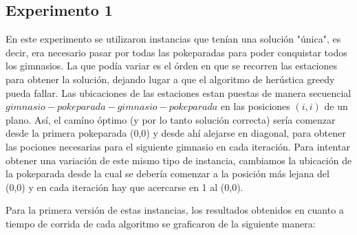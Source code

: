     \subsection{Experimento 1}
        En este experimento se utilizaron instancias que tenían una solución "única", es decir, era necesario pasar por todas las pokeparadas para poder conquistar todos los gimnasios. La que podía variar es el órden en que se recorren las estaciones para obtener la solución, dejando lugar a que el algoritmo de herústica greedy pueda fallar. Las ubicaciones de las estaciones estan puestas de manera secuencial $gimnasio-pokeparada-gimnasio-pokeparada$ en las posiciones $(i,i)$ de un plano. Así, el camíno óptimo (y por lo tanto solución correcta) sería comenzar desde la primera pokeparada (0,0) y desde ahí alejarse en diagonal, para obtener las pociones necesarias para el siguiente gimnasio en cada iteración.
        Para intentar obtener una variación de este mismo tipo de instancia, cambiamos la ubicación de la pokeparada desde la cual se debería comenzar a la posición más lejana del (0,0) y en cada iteración hay que acercarse en 1 al (0,0). 

        Para la primera versión de estas instancias, los resultados obtenidos en cuanto a tiempo de corrida de cada algoritmo se graficaron de la siguiente manera:

        \blindtext

